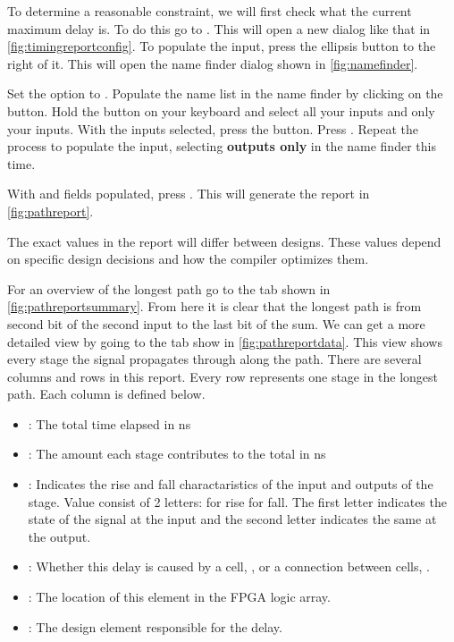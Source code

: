 \documentclass[12pt]{labmanual}
\begin{document}
\begin{minipage}[t]{0.45\textwidth}
\vspace{-100mm} %
To determine a reasonable constraint, we will first check what the current maximum delay is. To do this go to .
This will open a new dialog like that in \autoref{fig:timingreportconfig}. To populate the  input, press the ellipsis button to the right of it. This will open the name finder dialog shown in \autoref{fig:namefinder}. 

Set the  option to . Populate the name list in the name finder by clicking on the  button. Hold the  button on your keyboard and select all your inputs and only your inputs. With the inputs selected, press the \keyword{$>$} button. Press . Repeat the process to populate the  input, selecting \textbf{outputs only} in the name finder this time.

With  and  fields populated, press . This will generate the report in \autoref{fig:pathreport}.
\hfill\break
\begin{extra}
    The exact values in the report will differ between designs. These values depend on specific design decisions and how the compiler optimizes them.
\end{extra}
\hfill\break
\end{minipage}

\clearpage

For an overview of the longest path go to the  tab shown in \autoref{fig:pathreportsummary}. From here it is clear that the longest path is from second bit of the second input to the last bit of the sum. We can get a more detailed view by going to the  tab show in \autoref{fig:pathreportdata}. This view shows every stage the signal propagates through along the path. There are several columns and rows in this report. Every row represents one stage in the longest path. Each column is defined below.
\begin{itemize}
    \item {}: The total time elapsed in ns
    \item {}: The amount each stage contributes to the total in ns
    \item {}: Indicates the rise and fall charactaristics of the input and outputs of the stage. Value consist of 2 letters:  for rise  for fall. The first letter indicates the state of the signal at the input and the second letter indicates the same at the output.
    \item {}: Whether this delay is caused by a cell, , or a connection between cells, .
    \item {}: The location of this element in the FPGA logic array.
    \item {}: The design element responsible for the delay.
\end{itemize}
\end{document}
